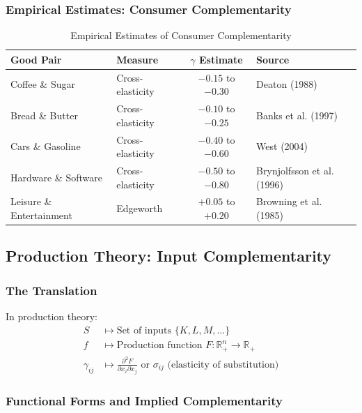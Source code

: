 \subsubsection{Empirical Estimates: Consumer Complementarity}

\begin{table}[h]
\centering
\caption{Empirical Estimates of Consumer Complementarity}
\label{tab:consumer-gamma}
\renewcommand{\arraystretch}{1.2}
\small
\begin{tabular}{@{}llcl@{}}
\toprule
\textbf{Good Pair} & \textbf{Measure} & \textbf{$\gamma$ Estimate} & \textbf{Source} \\
\midrule
Coffee \& Sugar & Cross-elasticity & $-0.15$ to $-0.30$ & Deaton (1988) \\
Bread \& Butter & Cross-elasticity & $-0.10$ to $-0.25$ & Banks et al. (1997) \\
Cars \& Gasoline & Cross-elasticity & $-0.40$ to $-0.60$ & West (2004) \\
Hardware \& Software & Cross-elasticity & $-0.50$ to $-0.80$ & Brynjolfsson et al. (1996) \\
Leisure \& Entertainment & Edgeworth & $+0.05$ to $+0.20$ & Browning et al. (1985) \\
\bottomrule
\end{tabular}
\end{table}

\subsection{Production Theory: Input Complementarity}

\subsubsection{The Translation}

\begin{axiom}
In production theory:
\begin{align}
S &\mapsto \text{Set of inputs } \{K, L, M, \ldots\} \\
f &\mapsto \text{Production function } F: \mathbb{R}^n_+ \to \mathbb{R}_+ \\
\gamma_{ij} &\mapsto \frac{\partial^2 F}{\partial x_i \partial x_j} \text{ or } \sigma_{ij} \text{ (elasticity of substitution)}
\end{align}
\end{axiom}

\subsubsection{Functional Forms and Implied Complementarity}

